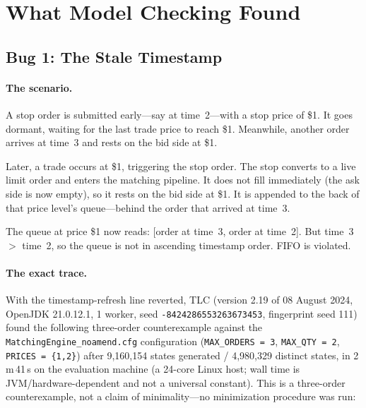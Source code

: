 \documentclass[11pt,a4paper]{article}
\begin{document}
\section{What Model Checking Found}
\label{sec:findings}

\subsection{Bug 1: The Stale Timestamp}
\label{sec:bug1}

\paragraph{The scenario.} A stop order is submitted early---say at
time~2---with a stop price of \$1. It goes dormant, waiting for the
last trade price to reach \$1. Meanwhile, another order arrives at
time~3 and rests on the bid side at \$1.

Later, a trade occurs at \$1, triggering the stop order. The stop
converts to a live limit order and enters the matching pipeline. It
does not fill immediately (the ask side is now empty), so it rests on
the bid side at \$1. It is appended to the back of that price level's
queue---behind the order that arrived at time~3.

The queue at price \$1 now reads: [order at time~3, order at time~2].
But time~3 $>$ time~2, so the queue is not in ascending timestamp order.
FIFO is violated.

\paragraph{The exact trace.} With the timestamp-refresh line reverted,
TLC (version 2.19 of 08 August 2024, OpenJDK 21.0.12.1, 1 worker, seed
\texttt{-8424286553263673453}, fingerprint seed 111) found the
following three-order counterexample against the
\texttt{MatchingEngine\_noamend.cfg} configuration (\texttt{MAX\_ORDERS
= 3}, \texttt{MAX\_QTY = 2}, \texttt{PRICES = \{1,2\}}) after
9{,}160{,}154 states generated / 4{,}980{,}329 distinct states, in
2\,m\,41\,s on the evaluation machine (a 24-core Linux host; wall time
is JVM/hardware-dependent and not a universal constant). This is a
three-order counterexample, not a claim of minimality---no minimization
procedure was run:
\end{document}
